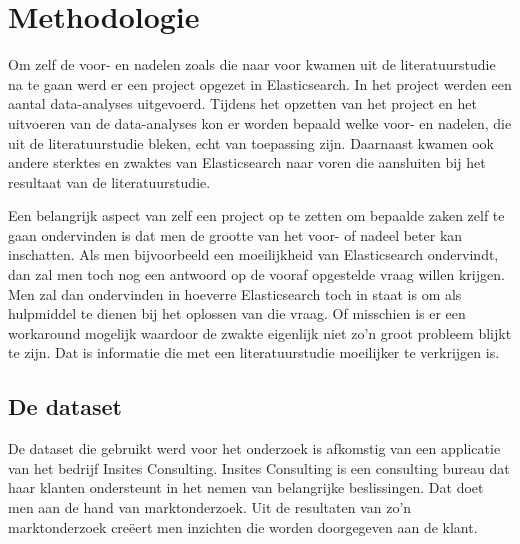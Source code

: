 
\chapter{Methodologie}
\label{ch:methodologie}


Om zelf de voor- en nadelen zoals die naar voor kwamen uit de literatuurstudie na te gaan werd er een project opgezet in Elasticsearch. In het project werden een aantal data-analyses uitgevoerd. Tijdens het opzetten van het project en het uitvoeren van de data-analyses kon er worden bepaald welke voor- en nadelen, die uit de literatuurstudie bleken, echt van toepassing zijn. Daarnaast kwamen ook andere sterktes en zwaktes van Elasticsearch naar voren die aansluiten bij het resultaat van de literatuurstudie.

Een belangrijk aspect van zelf een project op te zetten om bepaalde zaken zelf te gaan ondervinden is dat men de grootte van het voor- of nadeel beter kan inschatten. Als men bijvoorbeeld een moeilijkheid van Elasticsearch ondervindt, dan zal men toch nog een antwoord op de vooraf opgestelde vraag willen krijgen. Men zal dan ondervinden in hoeverre Elasticsearch toch in staat is om als hulpmiddel te dienen bij het oplossen van die vraag. Of misschien is er een workaround mogelijk waardoor de zwakte eigenlijk niet zo'n groot probleem blijkt te zijn. Dat is informatie die met een literatuurstudie moeilijker te verkrijgen is.

\section{De dataset}
De dataset die gebruikt werd voor het onderzoek is afkomstig van een applicatie van het bedrijf Insites Consulting. Insites Consulting is een consulting bureau dat haar klanten ondersteunt in het nemen van belangrijke beslissingen. Dat doet men aan de hand van marktonderzoek. Uit de resultaten van zo'n marktonderzoek creëert men inzichten die worden doorgegeven aan de klant. 

